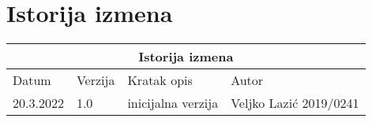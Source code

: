 \section{Istorija izmena}

\begin{center}
 \begin{tabular}{ |p{3cm}||p{3cm}|p{3cm}|p{5cm}|  }
 \hline
 \multicolumn{4}{|c|}{Istorija izmena} \\
 \hline
 Datum & Verzija & Kratak opis & Autor\\
 \hline
    20.3.2022 & 1.0 & inicijalna verzija & Veljko Lazić 2019/0241\\
 \hline
\end{tabular}
\end{center}



